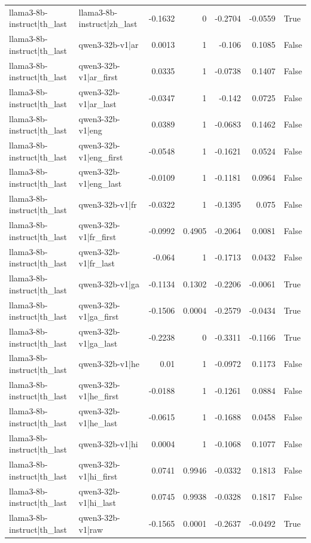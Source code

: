 \begin{table}
\begin{tabular}{l l r r r r l}
llama3-8b-instruct|th_last & llama3-8b-instruct|zh_last & -0.1632 & 0 & -0.2704 & -0.0559 & True \\
llama3-8b-instruct|th_last & qwen3-32b-v1|ar & 0.0013 & 1 & -0.106 & 0.1085 & False \\
llama3-8b-instruct|th_last & qwen3-32b-v1|ar_first & 0.0335 & 1 & -0.0738 & 0.1407 & False \\
llama3-8b-instruct|th_last & qwen3-32b-v1|ar_last & -0.0347 & 1 & -0.142 & 0.0725 & False \\
llama3-8b-instruct|th_last & qwen3-32b-v1|eng & 0.0389 & 1 & -0.0683 & 0.1462 & False \\
llama3-8b-instruct|th_last & qwen3-32b-v1|eng_first & -0.0548 & 1 & -0.1621 & 0.0524 & False \\
llama3-8b-instruct|th_last & qwen3-32b-v1|eng_last & -0.0109 & 1 & -0.1181 & 0.0964 & False \\
llama3-8b-instruct|th_last & qwen3-32b-v1|fr & -0.0322 & 1 & -0.1395 & 0.075 & False \\
llama3-8b-instruct|th_last & qwen3-32b-v1|fr_first & -0.0992 & 0.4905 & -0.2064 & 0.0081 & False \\
llama3-8b-instruct|th_last & qwen3-32b-v1|fr_last & -0.064 & 1 & -0.1713 & 0.0432 & False \\
llama3-8b-instruct|th_last & qwen3-32b-v1|ga & -0.1134 & 0.1302 & -0.2206 & -0.0061 & True \\
llama3-8b-instruct|th_last & qwen3-32b-v1|ga_first & -0.1506 & 0.0004 & -0.2579 & -0.0434 & True \\
llama3-8b-instruct|th_last & qwen3-32b-v1|ga_last & -0.2238 & 0 & -0.3311 & -0.1166 & True \\
llama3-8b-instruct|th_last & qwen3-32b-v1|he & 0.01 & 1 & -0.0972 & 0.1173 & False \\
llama3-8b-instruct|th_last & qwen3-32b-v1|he_first & -0.0188 & 1 & -0.1261 & 0.0884 & False \\
llama3-8b-instruct|th_last & qwen3-32b-v1|he_last & -0.0615 & 1 & -0.1688 & 0.0458 & False \\
llama3-8b-instruct|th_last & qwen3-32b-v1|hi & 0.0004 & 1 & -0.1068 & 0.1077 & False \\
llama3-8b-instruct|th_last & qwen3-32b-v1|hi_first & 0.0741 & 0.9946 & -0.0332 & 0.1813 & False \\
llama3-8b-instruct|th_last & qwen3-32b-v1|hi_last & 0.0745 & 0.9938 & -0.0328 & 0.1817 & False \\
llama3-8b-instruct|th_last & qwen3-32b-v1|raw & -0.1565 & 0.0001 & -0.2637 & -0.0492 & True \\

\end{tabular}
\end{table}
